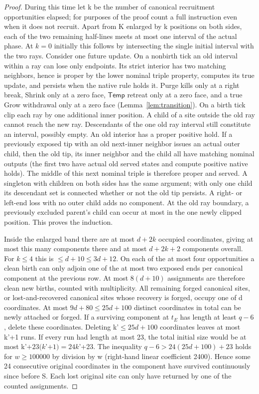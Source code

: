 \begin{proof}
During this time let k be the number of canonical recruitment opportunities elapsed; for purposes of the proof count a full instruction even when it does not recruit. Apart from K enlarged by k positions on both sides, each of the two remaining half-lines meets at most one interval of the actual phase. At \(k=0\) initially this follows by intersecting the single initial interval with the two rays. Consider one future update. On a nonbirth tick an old interval within a ray can lose only endpoints. Its strict interior has two matching neighbors, hence is proper by the lower nominal triple property, computes its true update, and persists when the native rule holds it. Purge kills only at a right break, Shrink only at a zero face, \(\mathsf{Temp}\) retreat only at a zero face, and a true Grow withdrawal only at a zero face (Lemma~\ref{lem:transition}). On a birth tick clip each ray by one additional inner position. A child of a site outside the old ray cannot reach the new ray. Descendants of the one old ray interval still constitute an interval, possibly empty. An old interior has a proper positive hold. If a previously exposed tip with an old next-inner neighbor issues an actual outer child, then the old tip, its inner neighbor and the child all have matching nominal outputs (the first two have actual old served states and compute positive native holds). The middle of this next nominal triple is therefore proper and served. A singleton with children on both sides has the same argument; with only one child its descendant set is connected whether or not the old tip persists. A right- or left-end loss with no outer child adds no component. At the old ray boundary, a previously excluded parent's child can occur at most in the one newly clipped position. This proves the induction.

Inside the enlarged band there are at most \(d+2k\) occupied coordinates, giving at most this many components there and at most \(d+2k+2\) components overall. For \(k\le 4\) this is \(\le\)\(d+10\)\(\le\)\(3d+12\). On each of the at most four opportunities a clean birth can only adjoin one of the at most two exposed ends per canonical component at the previous row. At most \(8(d+10)\) assignments are therefore clean new births, counted with multiplicity. All remaining forged canonical sites, or lost-and-recovered canonical sites whose recovery is forged, occupy one of d coordinates. At most \(9d+80\le 25d+100\) distinct coordinates in total can be newly attached or forged. If a surviving component at \(t_E\) has length at least \(q- 6\), delete these coordinates. Deleting k'\(\le\)\(25d+100\) coordinates leaves at most k'+1 runs. If every run had length at most 23, the total initial size would be at most k'\(+23(k\)'\(+1)=24k\)'+23. The inequality \(q- 6>24(25d+100)+23\) holds for \(w\ge 100000\) by division by w (right-hand linear coefficient 2400). Hence some 24 consecutive original coordinates in the component have survived continuously since before S. Each lost original site can only have returned by one of the counted assignments.


\end{proof}
